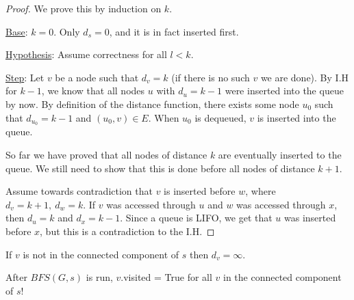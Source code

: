 \begin{proof}
We prove this by induction on $k$. 

\underline{Base}: $k=0$. Only $d_s=0$, and it is in fact inserted first.

\underline{Hypothesis}: Assume correctness for all $l<k$.

\underline{Step}: Let $v$ be a node such that $d_v=k$ (if there is no such $v$ we are done). By I.H for $k-1$, we know that all nodes $u$ with $d_u=k-1$ were inserted into the queue by now. By definition of the distance function, there exists some node $u_0$ such that $d_{u_0}=k-1$ and $(u_0,v)\in E$. When $u_0$ is dequeued, $v$ is inserted into the queue. 

So far we have proved that all nodes of distance $k$ are eventually inserted to the queue. We still need to show that this is done before all nodes of distance $k+1$. 

Assume towards contradiction that $v$ is inserted before $w$, where $d_v=k+1,\ d_w=k$. If $v$ was accessed through $u$ and $w$ was accessed through $x$, then $d_u = k$ and $d_x=k-1$. Since a queue is LIFO, we get that $u$ was inserted before $x$, but this is a contradiction to the I.H.


\end{proof}

\begin{remark}
If $v$ is not in the connected component of $s$ then $d_v=\infty$.
\end{remark}


\begin{corollary}
After $BFS(G,s)$ is run, $v$.visited = True for all $v$ in the connected component of $s$!
\end{corollary}



